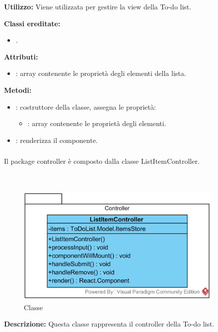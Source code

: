 \textbf{Utilizzo:}
Viene utilizzata per gestire la view della To-do list.

\textbf{Classi ereditate:}
\begin{itemize}
	\item {}.
\end{itemize}

\textbf{Attributi:}
\begin{itemize}
	\item {}: array contenente le proprietà degli elementi della lista.
\end{itemize}

\textbf{Metodi:}
\begin{itemize}
	\item {}: costruttore della classe, assegna le proprietà:
	\begin{itemize}
		\item {}: array contenente le proprietà degli elementi.
	\end{itemize}
	\item {}: renderizza il componente.
\end{itemize}

\subsubsection[::Controller]{\class} \label{\class}
Il package controller è composto dalla classe ListItemController.


\paragraph[::ListItemController]{\class}\mbox{}\\ \label{\class}
\begin{figure}[H]
	\centering
	\includegraphics[width=10cm]{./diagrammi/todo/todocontroller.png}
	\caption{Classe \class}
\end{figure}
\textbf{Descrizione:}
Questa classe rappresenta il controller della To-do list.

